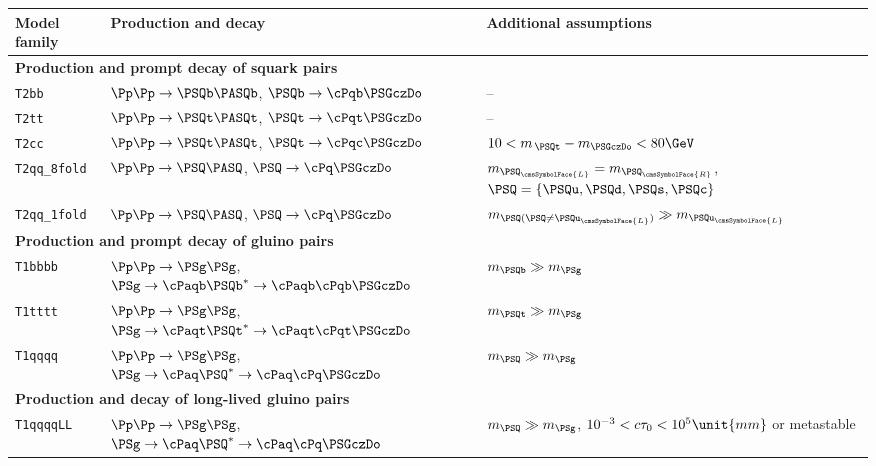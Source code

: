 \begingroup
\renewcommand*{\arraystretch}{1.2}
\begin{table}[!t]
  \label{tab:sms}
  \centering
  \begin{tabular}{ lll }
    \hline
    Model family
    & Production and decay
    & Additional assumptions                                                         \\
    \hline
    \multicolumn{3}{l}{\bf Production and prompt decay of squark pairs}           \\
    \texttt{T2bb}
    & $\Pp\Pp \to \PSQb\PASQb$,
    $\PSQb \to \cPqb\PSGczDo$
    & --                                                                             \\
    \texttt{T2tt}
    & $\Pp\Pp \to \PSQt\PASQt$,
    $\PSQt \to \cPqt\PSGczDo$
    & --                                                                             \\
    \texttt{T2cc}
    & $\Pp\Pp \to \PSQt\PASQt$,
    $\PSQt\to \cPqc\PSGczDo$
    & $10 < m_{\,\PSQt} - m_{\PSGczDo} < 80\GeV$                                     \\
    \texttt{T2qq\_8fold}
    & $\Pp\Pp \to \PSQ\PASQ$,
    $\PSQ \to \cPq\PSGczDo$
    & $m_{\PSQ_\cmsSymbolFace{L}} = m_{\PSQ_\cmsSymbolFace{R}}$,
    $\PSQ = \{ \PSQu, \PSQd, \PSQs, \PSQc \}$                                     \\
    \texttt{T2qq\_1fold}
    & $\Pp\Pp \to \PSQ\PASQ$,
    $\PSQ \to \cPq\PSGczDo$
    & $m_{\PSQ (\PSQ \neq \PSQu_\cmsSymbolFace{L})} \gg m_{\PSQu_\cmsSymbolFace{L}}$ \\
    \multicolumn{3}{l}{\bf Production and prompt decay of gluino pairs}           \\
    \texttt{T1bbbb}
    & $\Pp\Pp \to \PSg\PSg$,
    $\PSg\to \cPaqb\PSQb^* \to \cPaqb\cPqb\PSGczDo$
    & $m_{\PSQb} \gg m_{\PSg}$                                                       \\
    \texttt{T1tttt}
    & $\Pp\Pp \to \PSg\PSg$,
    $\PSg\to \cPaqt\PSQt^* \to \cPaqt\cPqt\PSGczDo$                                                                   
    & $m_{\PSQt} \gg m_{\PSg}$                                                       \\
    \texttt{T1qqqq}
    & $\Pp\Pp \to \PSg\PSg$,
    $\PSg\to \cPaq\PSQ^* \to \cPaq\cPq\PSGczDo$                                                                   
    & $m_{\PSQ} \gg m_{\PSg}$                                                        \\
    \multicolumn{3}{l}{\bf Production and decay of long-lived gluino pairs}       \\
    \texttt{T1qqqqLL}
    & $\Pp\Pp \to \PSg\PSg$,
    $\PSg \to \cPaq\PSQ^* \to \cPaq\cPq\PSGczDo$    
    & $m_{\PSQ} \gg m_{\PSg}$, $10^{-3} < \ctau < 10^{5}\unit{mm}$ or metastable    \\
    \hline
  \end{tabular}
\end{table}
\endgroup 

